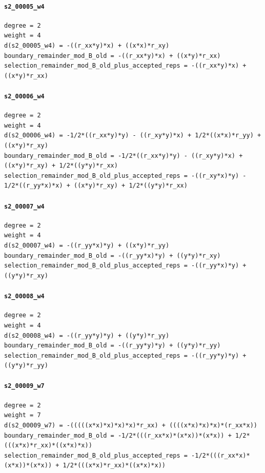 \documentclass[11pt]{article}
\begin{document}
\paragraph{\texttt{s2\_00005\_w4}}
\begin{verbatim}
degree = 2
weight = 4
d(s2_00005_w4) = -((r_xx*y)*x) + ((x*x)*r_xy)
boundary_remainder_mod_B_old = -((r_xx*y)*x) + ((x*y)*r_xx)
selection_remainder_mod_B_old_plus_accepted_reps = -((r_xx*y)*x) + ((x*y)*r_xx)
\end{verbatim}
\paragraph{\texttt{s2\_00006\_w4}}
\begin{verbatim}
degree = 2
weight = 4
d(s2_00006_w4) = -1/2*((r_xx*y)*y) - ((r_xy*y)*x) + 1/2*((x*x)*r_yy) + ((x*y)*r_xy)
boundary_remainder_mod_B_old = -1/2*((r_xx*y)*y) - ((r_xy*y)*x) + ((x*y)*r_xy) + 1/2*((y*y)*r_xx)
selection_remainder_mod_B_old_plus_accepted_reps = -((r_xy*x)*y) - 1/2*((r_yy*x)*x) + ((x*y)*r_xy) + 1/2*((y*y)*r_xx)
\end{verbatim}
\paragraph{\texttt{s2\_00007\_w4}}
\begin{verbatim}
degree = 2
weight = 4
d(s2_00007_w4) = -((r_yy*x)*y) + ((x*y)*r_yy)
boundary_remainder_mod_B_old = -((r_yy*x)*y) + ((y*y)*r_xy)
selection_remainder_mod_B_old_plus_accepted_reps = -((r_yy*x)*y) + ((y*y)*r_xy)
\end{verbatim}
\paragraph{\texttt{s2\_00008\_w4}}
\begin{verbatim}
degree = 2
weight = 4
d(s2_00008_w4) = -((r_yy*y)*y) + ((y*y)*r_yy)
boundary_remainder_mod_B_old = -((r_yy*y)*y) + ((y*y)*r_yy)
selection_remainder_mod_B_old_plus_accepted_reps = -((r_yy*y)*y) + ((y*y)*r_yy)
\end{verbatim}
\paragraph{\texttt{s2\_00009\_w7}}
\begin{verbatim}
degree = 2
weight = 7
d(s2_00009_w7) = -(((((x*x)*x)*x)*x)*r_xx) + ((((x*x)*x)*x)*(r_xx*x))
boundary_remainder_mod_B_old = -1/2*(((r_xx*x)*(x*x))*(x*x)) + 1/2*(((x*x)*r_xx)*((x*x)*x))
selection_remainder_mod_B_old_plus_accepted_reps = -1/2*(((r_xx*x)*(x*x))*(x*x)) + 1/2*(((x*x)*r_xx)*((x*x)*x))
\end{verbatim}
\end{document}
